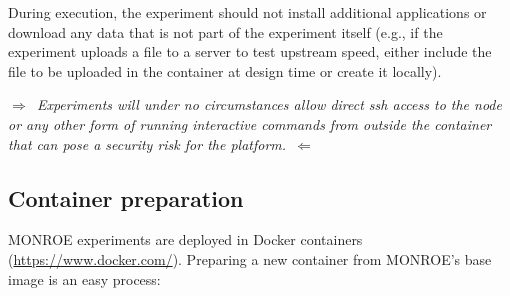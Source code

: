 \documentclass[a4paper,10pt]{article}
\newcommand{\monroe}{MONROE}
\begin{document}
During execution, the experiment should not install additional applications or download any data that is not part of the experiment itself (e.g., if the experiment uploads a file to a server to test upstream speed, either include the file to be uploaded in the container at design time or create it locally).

\emph{$\Rightarrow$~Experiments will under no circumstances allow direct ssh access to the node or any other form of running interactive commands from outside the container that can pose a security risk for the platform.~$\Leftarrow$}\newline

\subsection{Container preparation}
\label{subsec:containerPreparation}

\monroe{} experiments are deployed in Docker containers (\url{https://www.docker.com/}).
Preparing a new container from \monroe{}'s base image is an easy process:
\end{document}
